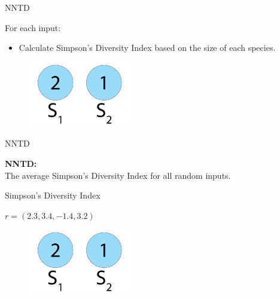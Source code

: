 \begin{frame}{NNTD}
\begin{center}
For each input:
  \begin{itemize}
	  \item Calculate Simpson's Diversity Index based on the size of each species.
  \end{itemize}
     \begin{figure}[p]
  \includegraphics[width=0.4\textwidth]{images/speciessize.png}
  \end{figure}
\end{center}
\end{frame}

\begin{frame}{NNTD}
\begin{center}
\textbf{NNTD:}\\
The average Simpson's Diversity Index for all random inputs.
\end{center}
\end{frame}

\begin{frame}{Simpson's Diversity Index}
\begin{center}
$r = (2.3, 3.4, -1.4, 3.2)$
  \begin{figure}[p]
  \includegraphics[width=0.4\textwidth]{images/speciessize.png}
  \end{figure}
\end{center}
\end{frame}

